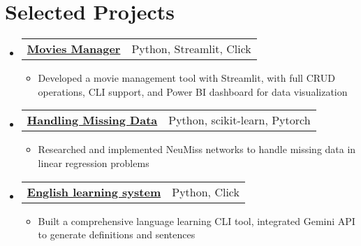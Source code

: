 \documentclass[letterpaper,11pt]{article}
\makeatletter
\newcommand{\subheading}[2]{
    \normalsize
    \begin{tabular*}{0.97\textwidth}[t]{l@{\extracolsep{\fill}}r}
      \textbf{#1} & #2 \\
    \end{tabular*}
    \vspace{-2pt}
}
\makeatother
\begin{document}


\section{Selected Projects}
\begin{itemize}
    \item \subheading{\href{https://github.com/ngntrgduc/movies-manager}{Movies Manager \faGithub}}
        {Python, Streamlit, Click}
        \begin{itemize}
            \item Developed a movie management tool
            with Streamlit, with full CRUD operations, CLI support, and Power BI dashboard for data visualization
        \end{itemize}

    \item \subheading{\href{https://github.com/ngntrgduc/seminar}{Handling Missing Data \faGithub}}
        {Python, scikit-learn, Pytorch}
        \begin{itemize}
            \item Researched and implemented NeuMiss networks to handle missing data in linear regression problems
        \end{itemize}
    
    \item \subheading{\href{https://github.com/ngntrgduc/english-learning-system}{English learning system \faGithub}}
        {Python, Click}
        \begin{itemize}
            \item Built a comprehensive language learning CLI tool, integrated Gemini API to generate definitions and sentences
        \end{itemize}


\end{itemize}
\end{document}
